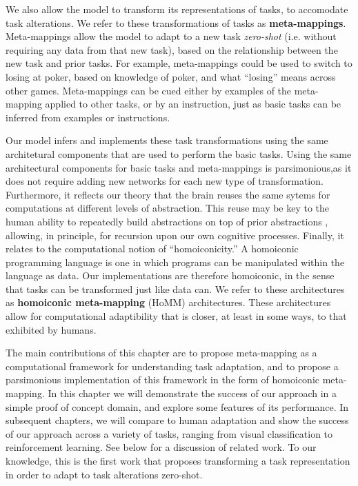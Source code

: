 We also allow the model to transform its representations of tasks, to accomodate task alterations. We refer to these transformations of tasks as \textbf{meta-mappings}. Meta-mappings allow the model to adapt to a new task \emph{zero-shot} (i.e. without requiring any data from that new task), based on the relationship between the new task and prior tasks. For example, meta-mappings could be used to switch to losing at poker, based on knowledge of poker, and what ``losing'' means across other games. Meta-mappings can be cued either by examples of the meta-mapping applied to other tasks, or by an instruction, just as basic tasks can be inferred from examples or instructions. 

Our model infers and implements these task transformations using the same architetural components that are used to perform the basic tasks. Using the same architectural components for basic tasks and meta-mappings is parsimonious,as it does not require adding new networks for each new type of transformation. Furthermore, it reflects our theory that the brain reuses the same sytems for computations at different levels of abstraction. This reuse may be key to the human ability to repeatedly build abstractions on top of prior abstractions \citep{Wilensky1991, Hazzan1999, Lampinen2017b}, allowing, in principle, for recursion upon our own cognitive processes. Finally, it relates to the computational notion of ``homoiconicity.'' A homoiconic programming language is one in which programs can be manipulated within the language as data. Our implementations are therefore homoiconic, in the sense that tasks can be transformed just like data can. We refer to these architectures as \textbf{homoiconic meta-mapping} (HoMM) architectures. These architectures allow for computational adaptibility that is closer, at least in some ways, to that exhibited by humans.  

The main contributions of this chapter are to propose meta-mapping as a computational framework for understanding task adaptation, and to propose a parsimonious implementation of this framework in the form of homoiconic meta-mapping. In this chapter we will demonstrate the success of our approach in a simple proof of concept domain, and explore some features of its performance. In subsequent chapters, we will compare to human adaptation and show the success of our approach across a variety of tasks, ranging from visual classification to reinforcement learning. See below for a discussion of related work. To our knowledge, this is the first work that proposes transforming a task representation in order to adapt to task alterations zero-shot. 


